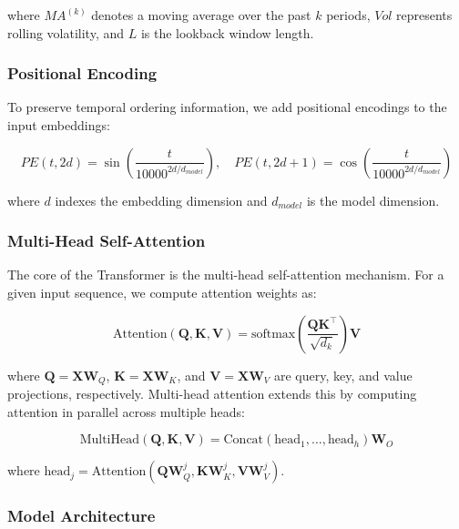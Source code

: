 \documentclass[preprint,authoryear,12pt]{elsarticle}
\begin{document}
where $MA^{(k)}$ denotes a moving average over the past $k$ periods, $Vol$ represents rolling volatility, and $L$ is the lookback window length.

\subsubsection{Positional Encoding}

To preserve temporal ordering information, we add positional encodings to the input embeddings:

\begin{equation}
PE(t, 2d) = \sin\left(\frac{t}{10000^{2d/d_{model}}}\right), \quad PE(t, 2d+1) = \cos\left(\frac{t}{10000^{2d/d_{model}}}\right)
\end{equation}

where $d$ indexes the embedding dimension and $d_{model}$ is the model dimension.

\subsubsection{Multi-Head Self-Attention}

The core of the Transformer is the multi-head self-attention mechanism. For a given input sequence, we compute attention weights as:

\begin{equation}
\text{Attention}(\mathbf{Q}, \mathbf{K}, \mathbf{V}) = \text{softmax}\left(\frac{\mathbf{Q}\mathbf{K}^\top}{\sqrt{d_k}}\right)\mathbf{V}
\end{equation}

where $\mathbf{Q} = \mathbf{X}\mathbf{W}_Q$, $\mathbf{K} = \mathbf{X}\mathbf{W}_K$, and $\mathbf{V} = \mathbf{X}\mathbf{W}_V$ are query, key, and value projections, respectively. Multi-head attention extends this by computing attention in parallel across multiple heads:

\begin{equation}
\text{MultiHead}(\mathbf{Q}, \mathbf{K}, \mathbf{V}) = \text{Concat}(\text{head}_1, \ldots, \text{head}_h)\mathbf{W}_O
\end{equation}

where $\text{head}_j = \text{Attention}(\mathbf{Q}\mathbf{W}_Q^j, \mathbf{K}\mathbf{W}_K^j, \mathbf{V}\mathbf{W}_V^j)$.

\subsubsection{Model Architecture}
\end{document}

